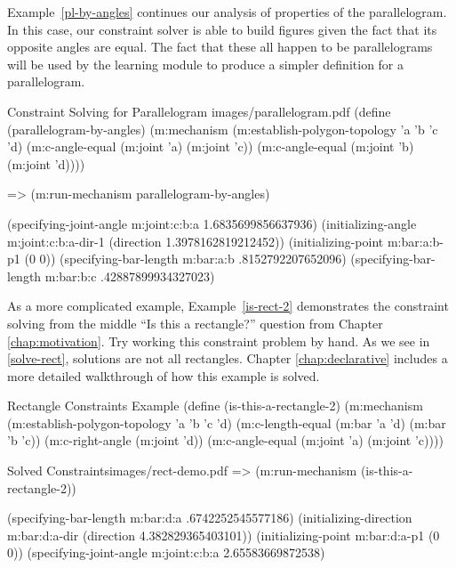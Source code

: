 Example~\ref{pl-by-angles} continues our analysis of properties of the
parallelogram. In this case, our constraint solver is able to build
figures given the fact that its opposite angles are equal. The fact
that these all happen to be parallelograms will be used by the
learning module to produce a simpler definition for a parallelogram.

\begin{pdf-example}
[label=pl-by-angles]
{Constraint Solving for Parallelogram}
{images/parallelogram.pdf}
(define (parallelogram-by-angles)
  (m:mechanism
   (m:establish-polygon-topology 'a 'b 'c 'd)
   (m:c-angle-equal (m:joint 'a)
                    (m:joint 'c))
   (m:c-angle-equal (m:joint 'b)
                    (m:joint 'd))))

=> (m:run-mechanism parallelogram-by-angles)

(specifying-joint-angle m:joint:c:b:a 1.6835699856637936)
(initializing-angle m:joint:c:b:a-dir-1 (direction 1.3978162819212452))
(initializing-point m:bar:a:b-p1 (0 0))
(specifying-bar-length m:bar:a:b .8152792207652096)
(specifying-bar-length m:bar:b:c .42887899934327023)
\end{pdf-example}

As a more complicated example, Example~\ref{is-rect-2} demonstrates
the constraint solving from the middle ``Is this a rectangle?''
question from Chapter \ref{chap:motivation}. Try working this
constraint problem by hand. As we see in \ref{solve-rect}, solutions
are not all rectangles. Chapter \ref{chap:declarative} includes a more
detailed walkthrough of how this example is solved.

\begin{code-example}
[label=is-rect-2]
{Rectangle Constraints Example}
(define (is-this-a-rectangle-2)
  (m:mechanism
   (m:establish-polygon-topology 'a 'b 'c 'd)
   (m:c-length-equal (m:bar 'a 'd)
                     (m:bar 'b 'c))
   (m:c-right-angle (m:joint 'd))
   (m:c-angle-equal (m:joint 'a)
                    (m:joint 'c))))
\end{code-example}

\begin{pdf-example}
[label=solve-rect]
{Solved Constraints}{images/rect-demo.pdf}
=> (m:run-mechanism (is-this-a-rectangle-2))

(specifying-bar-length m:bar:d:a .6742252545577186)
(initializing-direction m:bar:d:a-dir (direction 4.382829365403101))
(initializing-point m:bar:d:a-p1 (0 0))
(specifying-joint-angle m:joint:c:b:a 2.65583669872538)
\end{pdf-example}

